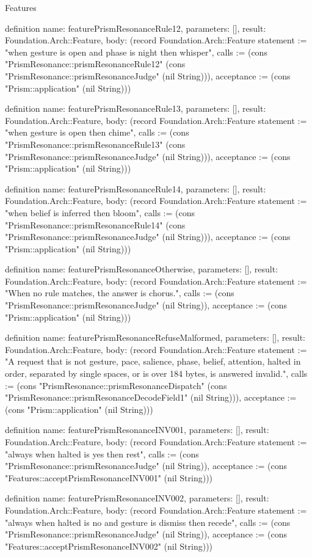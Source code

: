 \begin{lexlean}{Features}
\begin{semanticmodule}
definition{
  name: featurePrismResonanceRule12,
  parameters: [],
  result: Foundation.Arch::Feature,
  body: (record Foundation.Arch::Feature {statement := "when gesture is open and phase is night then whisper", calls := (cons "PrismResonance::prismResonanceRule12" (cons "PrismResonance::prismResonanceJudge" (nil String))), acceptance := (cons "Prism::application" (nil String))})
}

definition{
  name: featurePrismResonanceRule13,
  parameters: [],
  result: Foundation.Arch::Feature,
  body: (record Foundation.Arch::Feature {statement := "when gesture is open then chime", calls := (cons "PrismResonance::prismResonanceRule13" (cons "PrismResonance::prismResonanceJudge" (nil String))), acceptance := (cons "Prism::application" (nil String))})
}

definition{
  name: featurePrismResonanceRule14,
  parameters: [],
  result: Foundation.Arch::Feature,
  body: (record Foundation.Arch::Feature {statement := "when belief is inferred then bloom", calls := (cons "PrismResonance::prismResonanceRule14" (cons "PrismResonance::prismResonanceJudge" (nil String))), acceptance := (cons "Prism::application" (nil String))})
}

definition{
  name: featurePrismResonanceOtherwise,
  parameters: [],
  result: Foundation.Arch::Feature,
  body: (record Foundation.Arch::Feature {statement := "When no rule matches, the answer is chorus.", calls := (cons "PrismResonance::prismResonanceJudge" (nil String)), acceptance := (cons "Prism::application" (nil String))})
}

definition{
  name: featurePrismResonanceRefuseMalformed,
  parameters: [],
  result: Foundation.Arch::Feature,
  body: (record Foundation.Arch::Feature {statement := "A request that is not gesture, pace, salience, phase, belief, attention, halted in order, separated by single spaces, or is over 184 bytes, is answered invalid.", calls := (cons "PrismResonance::prismResonanceDispatch" (cons "PrismResonance::prismResonanceDecodeField1" (nil String))), acceptance := (cons "Prism::application" (nil String))})
}

definition{
  name: featurePrismResonanceINV001,
  parameters: [],
  result: Foundation.Arch::Feature,
  body: (record Foundation.Arch::Feature {statement := "always when halted is yes then rest", calls := (cons "PrismResonance::prismResonanceJudge" (nil String)), acceptance := (cons "Features::acceptPrismResonanceINV001" (nil String))})
}

definition{
  name: featurePrismResonanceINV002,
  parameters: [],
  result: Foundation.Arch::Feature,
  body: (record Foundation.Arch::Feature {statement := "always when halted is no and gesture is dismiss then recede", calls := (cons "PrismResonance::prismResonanceJudge" (nil String)), acceptance := (cons "Features::acceptPrismResonanceINV002" (nil String))})
}


\end{semanticmodule}
\end{lexlean}
